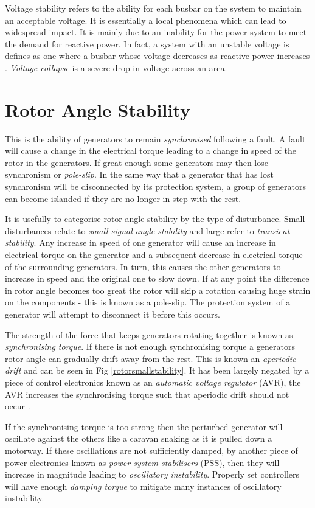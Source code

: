 \documentclass[a4paper,oneside,12pt]{report}
\begin{document}
Voltage stability refers to the ability for each busbar on the system to maintain an acceptable voltage. It is essentially a local phenomena which can lead to widespread impact. It is mainly due to an inability for the power system to meet the demand for reactive power. In fact, a system with an unstable voltage is defines as one where a busbar whose voltage decreases as reactive power increases \cite{Kundur1994}. \emph{Voltage collapse} is a severe drop in voltage across an area.

\section{Rotor Angle Stability}

This is the ability of generators to remain \emph{synchronised} following a fault. A fault will cause a change in the electrical torque leading to a change in speed of the rotor in the generators. If great enough some generators may then lose synchronism or \emph{pole-slip}. In the same way that a generator that has lost synchronism will be disconnected by its protection system, a group of generators can become islanded if they are no longer in-step with the rest.

It is usefully to categorise rotor angle stability by the type of disturbance. Small disturbances relate to \emph{small signal angle stability} and large refer to \emph{transient stability}. Any increase in speed of one generator will cause an increase in electrical torque on the generator and a subsequent decrease in electrical torque of the surrounding generators. In turn, this causes the other generators to increase in speed and the original one to slow down. If at any point the difference in rotor angle becomes too great the rotor will skip a rotation causing huge strain on the components - this is known as a pole-slip. The protection system of a generator will attempt to disconnect it before this occurs.

The strength of the force that keeps generators rotating together is known as \emph{synchronising torque}. If there is not enough synchronising torque a generators rotor angle can gradually drift away from the rest. This is known an \emph{aperiodic drift} and can be seen in Fig \ref{rotorsmallstability}. It has been largely negated by a piece of control electronics known as an \emph{automatic voltage regulator} (AVR), the AVR increases the synchronising torque such that aperiodic drift should not occur \cite{Bennet1999}.

If the synchronising torque is too strong then the perturbed generator will oscillate against the others like a caravan snaking as it is pulled down a motorway. If these oscillations are not sufficiently damped, by another piece of power electronics known as \emph{power system stabilisers} (PSS), then they will increase in magnitude leading to \emph{oscillatory instability}. Properly set controllers will have enough \emph{damping torque} to mitigate many instances of oscillatory instability.
\end{document}
